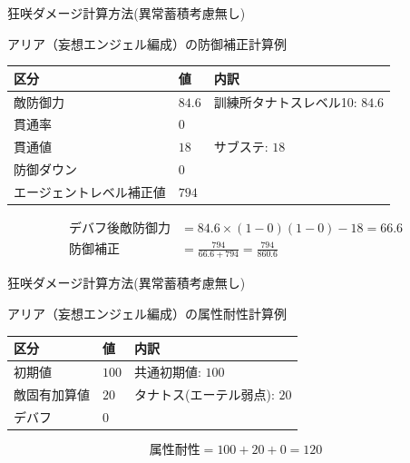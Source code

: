 \documentclass[aspectratio=169]{beamer}
\begin{document}
\begin{frame}{狂咲ダメージ計算方法(異常蓄積考慮無し)}
\begin{block}{アリア（妄想エンジェル編成）の防御補正計算例}
\small
\begin{tabularx}{\linewidth}{@{}l l X@{}}
区分 & 値 & 内訳 \\
\midrule
敵防御力 & $84.6$ & 訓練所タナトスレベル10: $84.6$ \\
\midrule
貫通率 & $0$ &  \\
\midrule
貫通値 & $18$ & サブステ: $18$\\
\midrule
防御ダウン & $0$ & \\
\midrule
エージェントレベル補正値 & $794$ & \\
\midrule
\end{tabularx}

\vspace{0.4em}
\[
\begin{aligned}
\text{デバフ後敵防御力} 
&=
84.6\times
(1-0)
(1-0)
-
18 = 66.6
\\
\text{防御補正}
&=
\frac{794}{66.6+794} = \frac{794}{860.6} 
\end{aligned}
\]
\end{block}
\end{frame}


\begin{frame}{狂咲ダメージ計算方法(異常蓄積考慮無し)}
\begin{block}{アリア（妄想エンジェル編成）の属性耐性計算例}
\small
\begin{tabularx}{\linewidth}{@{}l l X@{}}
区分 & 値 & 内訳 \\
\midrule
初期値 & $100$ & 共通初期値: $100$ \\
\midrule
敵固有加算値 & $20$ & タナトス(エーテル弱点): $20$ \\
\midrule
デバフ & $0$ & \\
\midrule
\end{tabularx}

\vspace{0.4em}
\[
  \text{属性耐性} = 100 + 20 + 0 = 120
\]
\end{block}
\end{frame}

\end{document}
